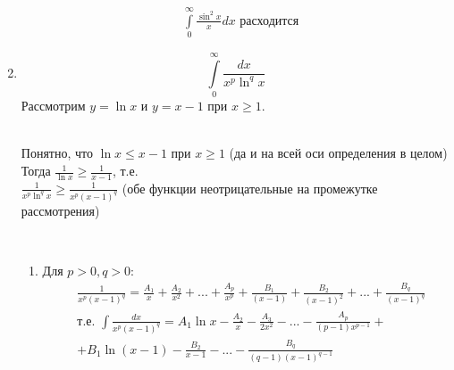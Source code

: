 \documentclass[a4paper, 12pt]{article}
\begin{document}
\begin{enumerate}
\begin{align*}
 &\int\limits_0^\infty \frac{\sin^2x}{x}dx \text{ расходится}
\end{align*}
\item %
$$\int\limits_0^\infty \frac{dx}{x^p\ln^qx}$$
Рассмотрим $y = \ln x $ и $y = x-1$ при $x \geq 1$. \\
     \\ [15pt]
    Понятно, что $\ln x \leq x-1$ при $x \geq 1$ (да и на всей оси определения в целом) \\
    Тогда $\frac{1}{\ln x} \geq \frac{1}{x-1}$, т.е. \\
    $\frac{1}{x^p\ln^q x} \geq \frac{1}{x^p(x-1)^q}$ (обе функции неотрицательные на 
    промежутке рассмотрения) \\
     \\
    \begin{enumerate}
     \item
     Для $p > 0, q > 0 $:
     \begin{align*}
      &\frac{1}{x^p(x-1)^q} = 
     \frac{A_1}{x}+\frac{A_2}{x^2}+...+\frac{A_p}{x^p} +
     \frac{B_1}{(x-1)}+\frac{B_2}{(x-1)^2}+...+\frac{B_q}{(x-1)^q} \\
     &\text{т.е. }
     \int\frac{dx}{x^p(x-1)^q} = 
     A_1\ln x -\frac{A_2}{x} - \frac{A_3}{2x^2}- ... - \frac{A_p}{(p-1)x^{p-1}} + \\
     &+ B_1\ln (x-1) - \frac{B_2}{x-1} -...- \frac{B_q}{(q-1)(x-1)^{q-1}} \\

\end{align*}
\end{enumerate}
\end{enumerate}
\end{document}
